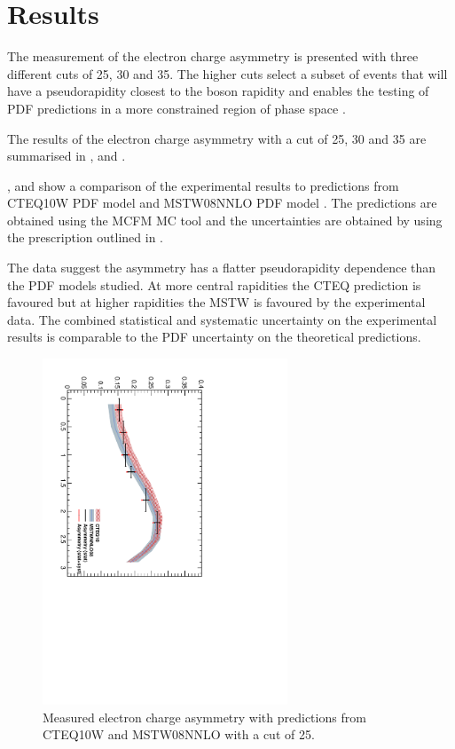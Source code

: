 \section{Results}
The measurement of the electron charge asymmetry is presented with three
different \pT cuts of 25, 30 and \unit{35}{\GeV}. 
The higher \Pt cuts select a subset of events that will have a pseudorapidity
closest to the \PW boson rapidity and enables the testing of PDF predictions in
a more constrained region of phase space \cite{asym36}.

The results of the electron charge asymmetry with a \pT cut of \unit{25}{\GeV},
\unit{30}{\GeV} and \unit{35}{\GeV} are summarised in ,
  and .

,  and  show
a comparison of the experimental results to predictions from
CTEQ10W PDF model \cite{lai2010vv} and MSTW08NNLO PDF model
\cite{martin2009parton}. The predictions are obtained using the
MCFM\cite{campbellmcfm} MC tool and the uncertainties are obtained by using the
prescription outlined in .

The data suggest the asymmetry has a flatter pseudorapidity dependence than the
PDF models studied. At more central rapidities the CTEQ prediction is favoured
but at higher rapidities the MSTW is favoured by the experimental data.
The combined statistical and systematic uncertainty on the experimental results
is comparable to the PDF uncertainty on the theoretical predictions.

\begin{figure}[htbp]
  \begin{center}
  \includegraphics*[width=0.65\textwidth,angle=90]{Asym_25}
  \caption[Measured electron charge asymmetry with a \pT cut of
{\unit{25}{\GeV}}]{\label{fig:asym25} Measured electron charge asymmetry with
predictions from CTEQ10W and MSTW08NNLO with a \pT cut of
\unit{25}{\GeV}\cite{baisini2010electron}.}
  \end{center}
\end{figure}

